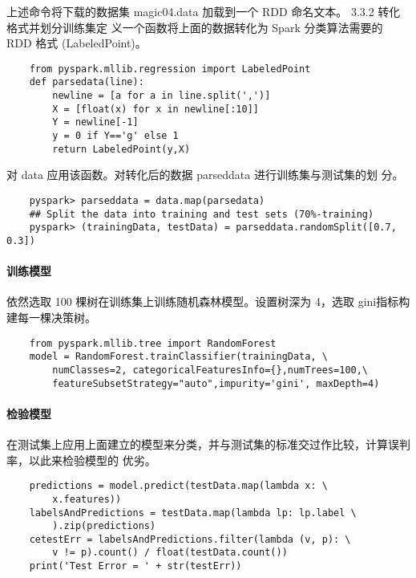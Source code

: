 上述命令将下载的数据集 magic04.data 加载到一个 RDD 命名文本。 3.3.2
转化格式并划分训练集定 义一个函数将上面的数据转化为 Spark 分类算法需要的
RDD 格式 (LabeledPoint)。

\begin{lstlisting}
	from pyspark.mllib.regression import LabeledPoint
	def parsedata(line):
	    newline = [a for a in line.split(',')]
	    X = [float(x) for x in newline[:10]]
	    Y = newline[-1]
	    y = 0 if Y=='g' else 1
	    return LabeledPoint(y,X)
\end{lstlisting}

对 data 应用该函数。对转化后的数据 parseddata 进行训练集与测试集的划
分。

\begin{lstlisting}
	pyspark> parseddata = data.map(parsedata)
	## Split the data into training and test sets (70%-training)
	pyspark> (trainingData, testData) = parseddata.randomSplit([0.7, 0.3])
\end{lstlisting}

\paragraph{训练模型}\label{ux8badux7ec3ux6a21ux578b-1}

依然选取 100 棵树在训练集上训练随机森林模型。设置树深为 4，选取
gini指标构建每一棵决策树。

\begin{lstlisting}
	from pyspark.mllib.tree import RandomForest
	model = RandomForest.trainClassifier(trainingData, \
	    numClasses=2, categoricalFeaturesInfo={},numTrees=100,\
	    featureSubsetStrategy="auto",impurity='gini', maxDepth=4)
\end{lstlisting}

\paragraph{检验模型}\label{ux68c0ux9a8cux6a21ux578b}

在测试集上应用上面建立的模型来分类，并与测试集的标准交过作比较，计算误判率，以此来检验模型的
优劣。

\begin{lstlisting}
	predictions = model.predict(testData.map(lambda x: \
	    x.features))
	labelsAndPredictions = testData.map(lambda lp: lp.label \
	    ).zip(predictions)
	cetestErr = labelsAndPredictions.filter(lambda (v, p): \
	    v != p).count() / float(testData.count())
	print('Test Error = ' + str(testErr))
\end{lstlisting}

